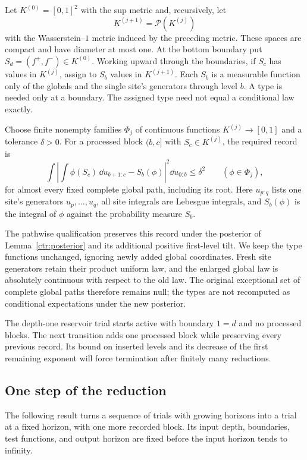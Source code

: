 Let $K^{(0)}=[0,1]^2$ with the sup metric and, recursively, let
\[
 K^{(j+1)}=\mathcal P(K^{(j)})
\]
with the Wasserstein--$1$ metric induced by the preceding metric. These
spaces are compact and have diameter at most one. At the bottom boundary
put $S_d=(f^+,f^-)\in K^{(0)}$. Working upward through the boundaries,
if $S_c$ has values in $K^{(j)}$, assign to $S_b$ values in $K^{(j+1)}$.
Each $S_b$ is a measurable function only of the globals and the single
site's generators through level $b$. A type is needed only at a boundary.
The assigned type need not equal a conditional law exactly.

Choose finite nonempty families $\Phi_j$ of continuous functions
$K^{(j)}\to[0,1]$ and a tolerance $\delta>0$. For a processed block
$(b,c]$ with $S_c\in K^{(j)}$, the required record is
\begin{equation}
 \int\left|
     \int\phi(S_c)\,\dd u_{b+1:c}-S_b(\phi)
     \right|^2\dd u_{0:b}\le\delta^2
       \qquad(\phi\in\Phi_j),
 \label{ctr:record}
\end{equation}
for almost every fixed complete global path, including its root.
Here $u_{p:q}$ lists one site's generators $u_p,\ldots,u_q$, all site
integrals are Lebesgue integrals, and $S_b(\phi)$ is the integral of
$\phi$ against the probability measure $S_b$.

The pathwise qualification preserves this record under the posterior of
Lemma~\ref{ctr:posterior} and its additional positive first-level tilt.
We keep the type functions unchanged, ignoring newly added global
coordinates. Fresh site generators retain their product uniform law,
and the enlarged global law is absolutely continuous with respect to
the old law. The original exceptional set of complete global paths
therefore remains null; the types are not recomputed as conditional
expectations under the new posterior.

The depth-one reservoir trial starts active with boundary $1=d$ and no
processed blocks. The next transition adds one processed block while
preserving every previous record. Its bound on inserted levels and its
decrease of the first remaining exponent will force termination after
finitely many reductions.

\subsection{One step of the reduction}

The following result turns a sequence of trials with growing horizons
into a trial at a fixed horizon, with one more recorded block.  Its input depth, boundaries,
test functions, and output horizon are fixed before the input horizon
tends to infinity.

